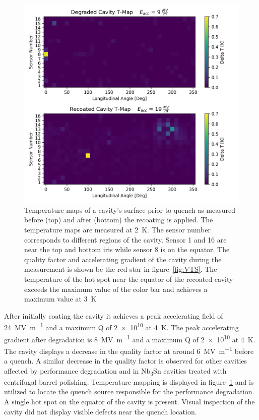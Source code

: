 \begin{figure}[h]%
    \centering%
    \includegraphics{./figures/TMAP.png}%
    \caption{Temperature maps of a cavity's surface prior to quench as measured before (top) and after (bottom) the recoating is applied. The temperature maps are measured at \qty{2}{\kelvin}. The sensor number corresponds to different regions of the cavity. Sensor 1 and 16 are near the top and bottom iris while sensor 8 is on the equator. The quality factor and accelerating gradient of the cavity during the measurement is shown be the red star in figure~{\protect\ref{fig:VTS}}. The temperature of the hot spot near the equator of the recoated cavity exceeds the maximum value of the color bar and achieves a maximum value at \qty{3}{\kelvin}}%
    \label{fig:TMAP}%
\end{figure}

After initially coating the cavity it achieves a peak accelerating field of \qty{24}{\mega\volt\per\meter} and a maximum Q of \num{2e10} at \qty{4}{\kelvin}. The peak accelerating gradient after degradation is \qty{8}{\mega\volt\per\meter} and a maximum Q of \num{2e10} at \qty{4}{\kelvin}. The cavity displays a decrease in the quality factor at around \qty{6}{\mega\volt\per\meter} before a quench. A similar decrease in the quality factor is observed for other cavities affected by performance degradation\cite{eremeev2023preservation,eremeev:srf2019-mop015} and in Nb\textsubscript{3}Sn cavities treated with centrifugal barrel polishing\cite{viklund2024improving}. Temperature mapping is displayed in figure~\ref{fig:TMAP} and is utilized to locate the quench source responsible for the performance degradation. A single hot spot on the equator of the cavity is present. Visual inspection of the cavity did not display visible defects near the quench location.

